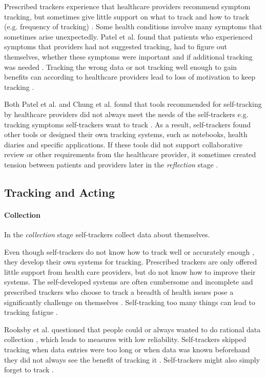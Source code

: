 Prescribed trackers experience that healthcare providers recommend symptom tracking, but sometimes give little support on what to track and how to track (e.g. frequency of tracking) \citep{Patel2012}. Some health conditions involve many symptoms that sometimes arise unexpectedly. Patel et al. found that patients who experienced symptoms that providers had not suggested tracking, had to figure out themselves, whether these symptoms were important and if additional tracking was needed \citep{Patel2012}. Tracking the wrong data or not tracking well enough to gain benefits can according to healthcare providers lead to loss of motivation to keep tracking \citep{Chung2015}.  

Both Patel et al. and Chung et al. found that tools recommended for self-tracking by healthcare providers did not always meet the needs of the self-trackers e.g. tracking symptoms self-trackers want to track \citep{Patel2012, Chung2016}. As a result, self-trackers found other tools or designed their own tracking systems, such as notebooks, health diaries and specific applications. If these tools did not support collaborative review or other requirements from the healthcare provider, it sometimes created tension between patients and providers later in the \textit{reflection} stage \citep{Chung2016}. 

\subsection{Tracking and Acting}					
\paragraph{Collection}
In the \textit{collection} stage self-trackers collect data about themselves. 

Even though self-trackers do not know how to track well or accurately enough \citep{Chung2015, Patel2012}, they develop their own systems for tracking. Prescribed trackers are only offered little support from health care providers, but do not know how to improve their systems. The self-developed systems are often cumbersome and incomplete and prescribed trackers who choose to track a breadth of health issues pose a significantly challenge on themselves \citep{Patel2012}. Self-tracking too many things can lead to tracking fatigue \citep{Choe2014}. 

Rooksby et al. questioned that people could or always wanted to do rational data collection \citep{Rooksby2014}, which leads to measures with low reliability. Self-trackers skipped tracking when data entries were too long or when data was known beforehand they did not always see the benefit of tracking it \citep{Epstein2015}. Self-trackers might also simply forget to track \citep{Li2010}. 

